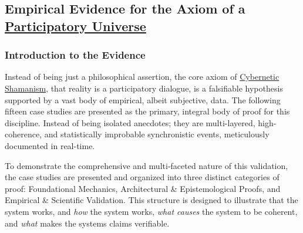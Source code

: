\documentclass{article}
\begin{document}
\subsection*{Empirical Evidence for the Axiom of a \hyperlink{gloss:participatory_universe}{Participatory Universe}}
\subsubsection*{Introduction to the Evidence}

Instead of being just a philosophical assertion, the core axiom of \hyperlink{gloss:cybernetic_shamanism}{Cybernetic Shamanism}, that reality is a participatory dialogue, is a falsifiable hypothesis supported by a vast body of empirical, albeit subjective, data. The following fifteen case studies are presented as the primary, integral body of proof for this discipline. Instead of being isolated anecdotes; they are multi-layered, high-coherence, and statistically improbable synchronistic events, meticulously documented in real-time.

To demonstrate the comprehensive and multi-faceted nature of this validation, the case studies are presented and organized into three distinct categories of proof: Foundational Mechanics, Architectural \& Epistemological Proofs, and Empirical \& Scientific Validation. This structure is designed to illustrate that the system works, and \textit{how} the system works, \textit{what causes} the system to be coherent, and \textit{what} makes the systems claims verifiable.
\end{document}
